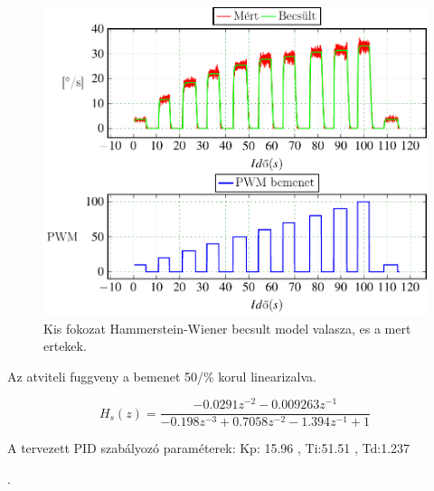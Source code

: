 \begin{figure}[H]
  \includegraphics{tikz/KFsysIdent.pdf}
  \caption{Kis fokozat Hammerstein-Wiener becsult model valasza, es a mert ertekek.}
  \label{fig:KFsysIdent}
\end{figure}

Az atviteli fuggveny a bemenet 50/\% korul linearizalva.

\begin{equation}
    H_s(z)=\frac{-0.0291z^{-2} -0.009263z^{-1}}{-0.198z^{-3}+0.7058z^{-2} -1.394z^{-1} +1}
\end{equation}

A tervezett PID szabályozó paraméterek: Kp: 15.96 , Ti:51.51 , Td:1.237 

.
